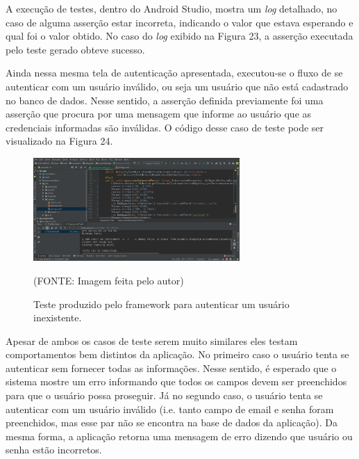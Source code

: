 \documentclass[
    12pt,       %
    openright,      %
    twoside,      %
    a4paper,      %
    english,      %
    french,       %
    spanish,      %
    brazil,       %
    ]{abntex2}
\begin{document}
      A execução de testes, dentro do Android Studio, mostra um \textit{log} detalhado, no caso de alguma
      asserção estar incorreta, indicando o valor que estava esperando e qual foi o valor obtido. No caso do
      \textit{log} exibido na Figura 23, a asserção executada pelo teste gerado obteve sucesso.

      Ainda nessa mesma tela de autenticação apresentada, executou-se o fluxo de se autenticar com
      um usuário inválido, ou seja um usuário que não está cadastrado no banco de dados. Nesse sentido,
      a asserção definida previamente foi uma asserção que procura por uma mensagem que informe ao
      usuário que as credenciais informadas são inválidas. O código desse caso de teste pode ser visualizado
      na Figura 24.

      \begin{figure}[htbp]
        \begin{center}
          \includegraphics[width=0.7\textwidth]{img/signInError.png}
            \end{center}
          \caption{\label{fig:passaro} Teste produzido pelo framework para autenticar um usuário inexistente.}
        \begin{center}(FONTE: Imagem feita pelo autor)\end{center}
      \end{figure}

      Apesar de ambos os casos de teste serem muito similares eles testam comportamentos bem distintos da
      aplicação. No primeiro caso o usuário tenta se autenticar sem fornecer todas as informações. Nesse
      sentido, é esperado que o sistema mostre um erro informando que todos os campos devem ser preenchidos
      para que o usuário possa proseguir. Já no segundo caso, o usuário tenta se autenticar com um usuário
      inválido (i.e. tanto campo de email e senha foram preenchidos, mas esse par não se encontra na base
      de dados da aplicação). Da mesma forma, a aplicação retorna uma mensagem de erro dizendo que usuário
      ou senha estão incorretos.
\end{document}
